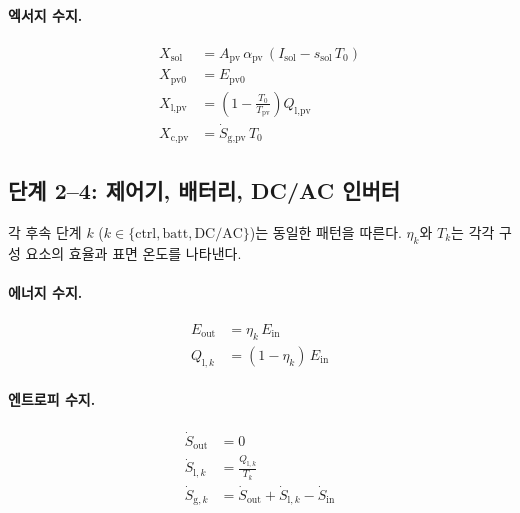 \paragraph{엑서지 수지.}
\begin{align}
  X_\text{sol}  &= A_\text{pv}\,\alpha_\text{pv}\,(I_\text{sol} - s_\text{sol}\,T_0)  \label{eq:pv-Xsol}  \\
  X_\text{pv0}  &= E_\text{pv0}                                                         \label{eq:pv-Xpv0}  \\
  X_\text{l,pv} &= \left(1 - \frac{T_0}{T_\text{pv}}\right) Q_\text{l,pv}             \label{eq:pv-Xlpv}  \\
  X_\text{c,pv} &= \dot{S}_\text{g,pv}\,T_0                                             \label{eq:pv-Xcpv}
\end{align}

\subsection{단계 2--4: 제어기, 배터리, DC/AC 인버터}
\label{sec:pv-stages234}

각 후속 단계 $k$ ($k \in \{\text{ctrl}, \text{batt}, \text{DC/AC}\}$)는 동일한 패턴을 따른다. $\eta_k$와 $T_k$는 각각 구성 요소의 효율과 표면 온도를 나타낸다.

\paragraph{에너지 수지.}
\begin{align}
  E_\text{out} &= \eta_k\,E_\text{in}          \label{eq:pv-generic-E}  \\
  Q_{\text{l},k} &= (1 - \eta_k)\,E_\text{in}   \label{eq:pv-generic-Ql}
\end{align}

\paragraph{엔트로피 수지.}
\begin{align}
  \dot{S}_\text{out}  &= 0                                                 \label{eq:pv-generic-Sout}  \\
  \dot{S}_{\text{l},k}  &= \frac{Q_{\text{l},k}}{T_k}                     \label{eq:pv-generic-Sl}    \\
  \dot{S}_{\text{g},k}  &= \dot{S}_\text{out} + \dot{S}_{\text{l},k} - \dot{S}_\text{in}  \label{eq:pv-generic-Sg}
\end{align}

